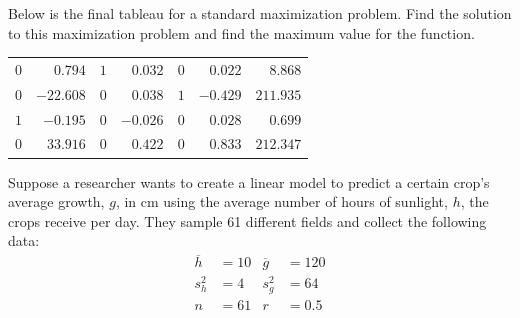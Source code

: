 \documentclass[12pt,letterpaper]{exam}
\begin{document}
\begin{questions}
\newpage
\question[10] Below is the final tableau for a standard maximization problem. Find the solution to this maximization problem and find the maximum value for the function.
	\begin{table}[!ht]
	\centering
	\begin{tabular}{rrrrrrr}
	$0$ & $0.794$ & $1$ & $0.032$ & $0$ & $0.022$ & $8.868$ \\
	$0$ & $-22.608$ & $0$ & $0.038$ & $1$ & $-0.429$ & $211.935$ \\
	$1$ & $-0.195$ & $0$ & $-0.026$ & $0$ & $0.028$ & $0.699$ \\
	$0$ & $33.916$ & $0$ & $0.422$ & $0$ & $0.833$ & $212.347$
	\end{tabular}
	\end{table}





\newpage
\question[10] Suppose a researcher wants to create a linear model to predict a certain crop's average growth, $g$, in cm using the average number of hours of sunlight, $h$, the crops receive per day. They sample 61 different fields and collect the following data:
	\[
	\begin{aligned}
	\overline{h}&= 10 & \overline{g}&= 120 \\
	s_h^2&= 4 & s_g^2&= 64 \\
	n&= 61 & r&= 0.5
	\end{aligned}
	\] \pspace







\end{questions}
\end{document}
